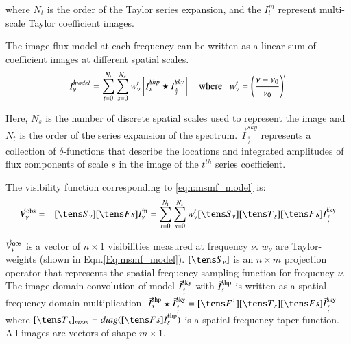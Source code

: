 \documentclass[11pt,a4paper,variablewidth]{article}
\begin{document}
where $N_t$ is the order of the Taylor series expansion, and 
the $I^m_t$ represent multi-scale Taylor coefficient images.

The image flux model at each frequency can be written as a linear sum of  
coefficient images at different spatial scales. 
\begin{equation}
\vec{I}^{model}_{\nu} = \sum_{t=0}^{N_t} \sum_{s=0}^{N_s} {w_{\nu}^t} \left[ \vec{I}^{shp}_s \star \vec{I}^{sky}_\frac{s}{t}\right] ~~~~\mathrm{where}~~~{w_{\nu}^t} = {\left(\frac{\nu-\nu_0}{\nu_0}\right)}^t 
\label{eqn:msmf_model}
\end{equation}

Here, $N_s$ is the number of discrete spatial scales used to represent the image and  
$N_t$ is the order of the series expansion of the spectrum. $\vec{I}^{sky}_\frac{s}{t}$ represents 
a collection of $\delta$-functions that describe the locations
and integrated amplitudes of flux components of scale $s$ in the image of the $t^{th}$ series 
coefficient. 

The visibility function corresponding to \ref{eqn:msmf_model} is:
\begin{eqnarray}
\vec{V}^{\rm obs}_{\nu} &=& [\Sna][\F]\vec{I}^{\rm m}_{\nu}
= \sum_{t=0}^{\Nt } \sum_{s=0}^{\Ns } \wnt [\Sna][\T_s][\F] \vec{I}^{\rm sky}_{s\atop t}
\label{eqn:msmfs_meqn}
\end{eqnarray}

$\vec{V}^{\rm obs}_{\nu}$ is a vector of $n\times 1$ visibilities
measured at frequency $\nu$.
$w_{\nu}$ are Taylor-weights (shown in Eqn.\ref{Eq:msmf_model}).
$[\Sna]$ is an $n\times m$ projection operator that represents the 
spatial-frequency sampling function for frequency $\nu$. 
The image-domain convolution of model $\vec{I}^{\rm sky}_{s\atop t}$ with
 ${\vec{I}}^{\rm shp}_s$ is written as a spatial-frequency-domain multiplication.
$ \vec{I}^{\rm shp}_s \star \vec{I}^{\rm sky}_{s\atop t} = [\Fd][\T_s][\F] \vec{I}^{\rm sky}_{s\atop t}$
where $[\T_s]_{m\times m} = diag([\F] \vec{I}^{\rm shp}_s)$ is a spatial-frequency
taper function.  All images are vectors of shape $m\times 1$.
\end{document}

